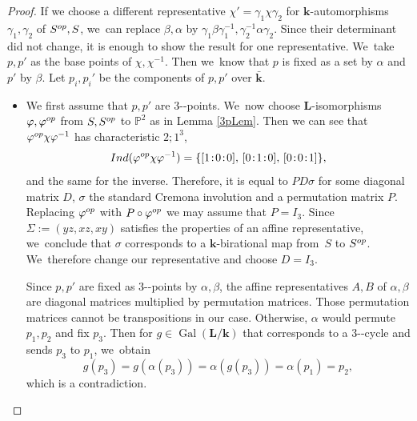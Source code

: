 \documentclass[10pt,a4paper]{amsart}
\providecommand{\nobreakdash}{\nobreak\hbox{-}}
\newcommand{\Ind}{\textup{Ind}}
\newcommand{\op}{\textup{op}}
\newcommand{\sep}{\mkern2mu{:}\mkern2mu}
\DeclareMathOperator{\Gal}{Gal}
\theoremstyle{definition}
\newcommand{\kk}{{\boldsymbol{k}}}
\newcommand{\LL}{{\boldsymbol{L}}}
\begin{document}
\begin{proof}
If we choose a different representative $\chi' = \gamma_1 \chi \gamma_2$ for $\kk$-automorphisms $\gamma_1, \gamma_2$ of $S^{\op},S$, we~can replace $\beta, \alpha$ by $\gamma_1 \beta \gamma_1^{-1}, \gamma_2^{-1} \alpha \gamma_2$. Since their determinant did not change, it is enough to show the result for one representative. We~take $p,p'$ as the base points of $\chi, \chi^{-1}$. Then we~know that $p$ is fixed as a set by $\alpha$ and $p'$ by $\beta$. Let $p_i,p_i'$ be the components of $p,p'$ over $\bar{\kk}$.
\begin{itemize}
\item We first assume that $p,p'$ are $3$\nobreakdash-points. We~now choose $\LL$-isomorphisms $\varphi, \varphi^{\op}$ from $S,S^{\op}$ to $\mathbb{P}^2$ as in Lemma \ref{3pLem}. Then we can see that $\varphi^{\op} \chi \varphi^{-1}$ has characteristic $2;1^3$,
\[
\Ind(\varphi^{\op} \chi \varphi^{-1}) = \{ [1\sep 0\sep 0],\, [0\sep 1\sep 0],\, [0\sep 0\sep 1]\},
\]
and the same for the inverse. Therefore, it is equal to $P D \sigma$ for some diagonal matrix $D$, $\sigma$ the standard Cremona involution and a permutation matrix $P$. Replacing $\varphi^{\op}$ with $P \circ \varphi^{\op}$ we may assume that $P = I_3$. Since $\Sigma:= (yz,xz,xy)$ satisfies the properties of an affine representative, we~conclude that $\sigma$ corresponds to a $\kk$-birational map from~$S$ to $S^{\op}$. We~therefore change our representative and choose $D=I_3$.

Since $p,p'$ are fixed as $3$\nobreakdash-points by $\alpha, \beta$, the affine representatives $A,B$ of $\alpha, \beta$ are diagonal matrices multiplied by permutation matrices. Those permutation matrices cannot be transpositions in our case. Otherwise, $\alpha$ would permute $p_1,p_2$ and fix $p_3$. Then for $g \in \Gal(\LL/\kk)$ that corresponds to a $3$\nobreakdash-cycle and sends $p_3$ to $p_1$, we~obtain
\[
g(p_3) = g(\alpha(p_3)) = \alpha(g(p_3)) = \alpha(p_1) = p_2,
\]
which is a contradiction.


\end{itemize}
\end{proof}
\end{document}
